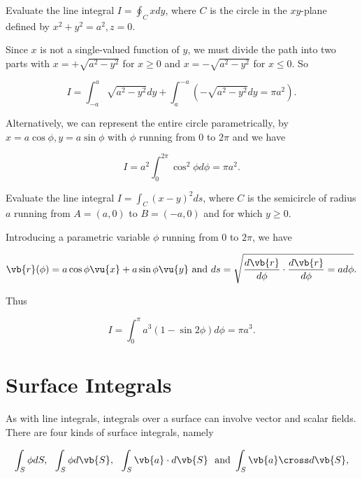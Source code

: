 \documentclass[english,a4paper,12pt]{report}
\begin{document}
{Evaluate the line integral \(\displaystyle I = \oint_{C} x dy\), where \(C\) is the circle in the \(xy\)-plane defined by \(x^2 + y^2 = a^2, z=0\). }
{Since \(x\) is not a single-valued function of \(y\), we must divide the path into two parts with \(x = +\sqrt{a^2-y^2} \) for \(x\geq 0\) and \(x = -\sqrt{a^2-y^2} \) for \(x \le 0\). So

\begin{equation}
	I = \int_{-a}^{a} \sqrt{a^2-y^2}dy + \int_{a}^{-a} (-\sqrt{a^2-y^2}dy= \pi a^2 )   .
\end{equation}

Alternatively, we can represent the entire circle parametrically, by \(x = a \cos \phi , y = a \sin \phi \) with \(\phi \) running from \(0\) to \(2 \pi \) and we have 

\begin{equation}
	I = a^2 \int_{0}^{2\pi } \cos ^2 \phi d\phi  = \pi a^2.
\end{equation}
} 

{Evaluate the line integral \(\displaystyle I = \int_{C}^{} (x-y)^2 ds \), where \(C\) is the semicircle of radius \(a\) running from \(A = (a,0)\) to \(B = (-a,0)\) and for which \(y \ge 0\).}
{Introducing a parametric variable \(\phi \) running from \(0\) to \(2\pi \), we have 

\begin{equation}
	\vb{r} (\phi ) = a \cos \phi \vu{x} + a \sin \phi \vu{y} \text { and } ds = \sqrt{\frac{d \vb{r} }{d\phi }\cdot \frac{d \vb{r} }{d\phi } = a d\phi}. 
\end{equation}

Thus

\begin{equation}
	I = \int_{0}^{\pi } a^3 (1-\sin 2\phi ) d\phi = \pi a^3 . 
\end{equation}
} 



\section{Surface Integrals}

As with line integrals, integrals over a surface can involve vector and scalar fields. There are four kinds of surface integrals, namely 

\begin{equation}
    \int_{S}^{} \phi dS, ~~ \int_{S}^{} \phi d\vb{S} , ~~ \int_{S}^{} \vb{a} \cdot d\vb{S} ~ \text { and } \int_{S}^{} \vb{a} \cross d\vb{S},    
\end{equation}
\end{document}
